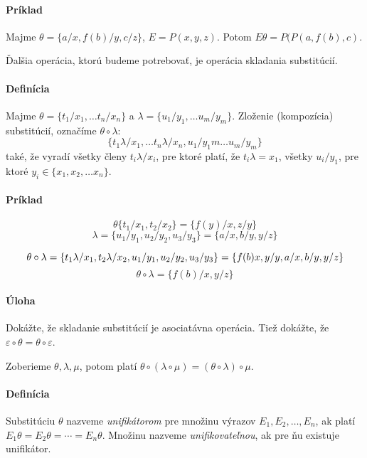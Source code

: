 \paragraph{Príklad} Majme $\theta=\{a/x, f(b)/y, c/z\}$, $E = P(x, y, z)$. Potom
$E\theta = P(P(a, f(b), c)$.

\par Ďalšia operácia, ktorú budeme potrebovať, je operácia skladania
substitúcií.

\paragraph{Definícia} Majme $\theta = \{t_1/x_1, \ldots t_n/x_n\}$ a $\lambda =
\{ u_1/y_1, \ldots u_m/y_m \}$. Zloženie (kompozícia) substitúcií, označíme
$\theta \circ \lambda$:
$$\{t_1 \lambda/x_1, \ldots t_n \lambda/x_n, u_1/y_1m \ldots u_m/y_m \}$$ také,
že vyradí všetky členy $t_i\lambda/x_i$, pre ktoré platí, že $t_i \lambda = x_1$,
všetky $u_i/y_1$, pre ktoré $y_i \in \{x_1, x_2, \ldots x_n\}$.

\paragraph{Príklad} 
$$\theta \{t_1/x_1, t_2/x_2\} = \{ f(y)/x, z/y\}$$
$$\lambda = \{ u_1/y_1, u_2/y_2, u_3/y_3\} = \{ a/x, b/y, y/z\}$$

$$ \theta \circ \lambda = \{ t_1 \lambda / x_1, t_2\lambda/x_2, u_1/y_1,
u_2/y_2, u_3/y_3\} = \\ 
\{ f(b)x, y/y, a/x, b/y, y/z\}$$
$$ \theta \circ \lambda = \{ f(b)/x, y/z\}$$

\paragraph{Úloha} Dokážte, že skladanie substitúcií je asociatávna operácia.
Tiež dokážte, že $\varepsilon \circ \theta = \theta \circ \varepsilon$.
\par Zoberieme $\theta, \lambda, \mu$, potom platí $ \theta \circ(\lambda \circ
\mu) = (\theta \circ \lambda) \circ \mu$.

\paragraph{Definícia} Substitúciu $\theta$ nazveme \emph{unifikátorom} pre
množinu výrazov $E_1, E_2, \ldots, E_n$, ak platí $E_1\theta = E_2\theta =
\cdots = E_n\theta$. Množinu nazveme \emph{unifikovateľnou}, ak pre ňu existuje
unifikátor.

